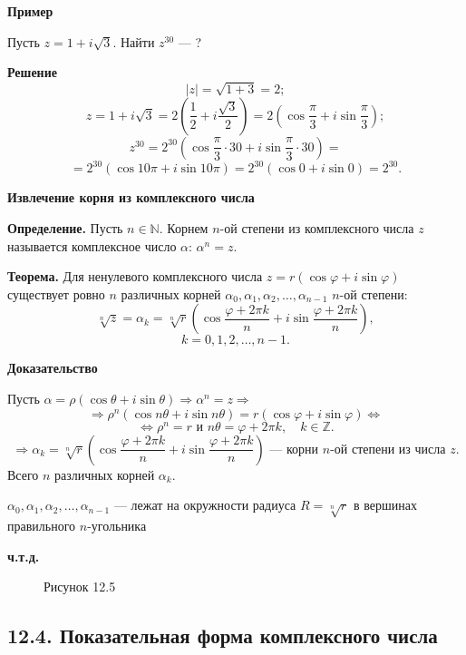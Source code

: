 \documentclass[12pt,a4paper]{article}
\begin{document}
\textbf{Пример}

Пусть $z=1+i\sqrt3$. Найти $z^{30}$ --- ?

\textbf{Решение}
$$
|z|=\sqrt{1+3}=2;
$$
$$
z=1+i\sqrt3=2\left(\frac12+i\frac{\sqrt3}{2}\right)=2\left(\cos\frac{\pi}{3}+i\sin\frac{\pi}{3}\right);
$$
$$
z^{30}=2^{30}\left(\cos\frac{\pi}{3}\cdot30+i\sin\frac{\pi}{3}\cdot30\right)=
$$
$$
=2^{30}(\cos10\pi+i\sin10\pi)=2^{30}(\cos0+i\sin0)=2^{30}.
$$

\textbf{Извлечение корня из комплексного числа}

\textbf{Определение.} Пусть $n\in\mathbb N$. Корнем $n$-ой степени из
комплексного числа $z$ называется комплексное число $\alpha$: $\alpha^n=z$.

\textbf{Теорема.} Для ненулевого комплексного числа
$z=r(\cos\varphi+i\sin\varphi)$ существует ровно $n$ различных корней
$\alpha_0,\alpha_1,\alpha_2,\ldots,\alpha_{n-1}$ $n$-ой степени:
$$
\sqrt[n]{z}=\alpha_k=\sqrt[n]{r}\left(\cos\frac{\varphi+2\pi
k}{n}+i\sin\frac{\varphi+2\pi k}{n}\right),
$$
$$
k=0,1,2,\ldots,n-1.
$$

\textbf{Доказательство}

Пусть $\alpha=\rho(\cos\theta+i\sin\theta)\Rightarrow \alpha^n=z\Rightarrow$
$$
\Rightarrow \rho^n(\cos n\theta+i\sin
n\theta)=r(\cos\varphi+i\sin\varphi)\Leftrightarrow
$$
$$
\Leftrightarrow \rho^n=r \text{ и } n\theta=\varphi+2\pi k,\quad k\in\mathbb Z.
$$
$$
\Rightarrow \alpha_k=\sqrt[n]{r}\left(\cos\frac{\varphi+2\pi
k}{n}+i\sin\frac{\varphi+2\pi k}{n}\right) \text{ --- корни }
n\text{-ой степени из числа } z.
$$
Всего $n$ различных корней $\alpha_k$.

$\alpha_0,\alpha_1,\alpha_2,\ldots,\alpha_{n-1}$ --- лежат на
окружности радиуса $R=\sqrt[n]{r}$ в вершинах правильного $n$-угольника

\textbf{ч.т.д.}

\begin{figure}[H]
\centering
{}
\caption*{Рисунок 12.5}
\end{figure}

\subsection*{\textbf{12.4. Показательная форма комплексного числа}}
\end{document}
